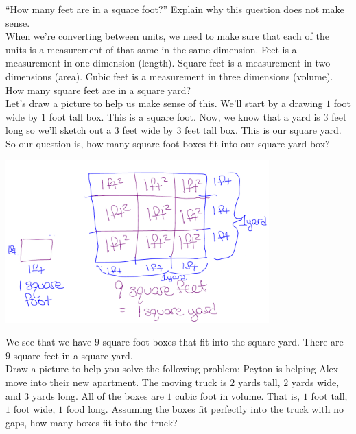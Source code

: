 \documentclass{ximera}
\begin{document}
\begin{exploration}

``How many feet are in a square foot?'' Explain why this question does not make sense.\\

When we're converting between units, we need to make sure that each of the units is a measurement of that same
in the same dimension. Feet is a measurement in one dimension (length). Square feet is a measurement in two dimensions (area). Cubic feet is a measurement in three dimensions (volume). \\

How many square feet are in a square yard?\\

Let's draw a picture to help us make sense of this. We'll start by a drawing $1$ foot wide by $1$ foot tall box. This is a square foot. Now, we know that a yard is $3$ feet long so we'll sketch out a $3$ feet wide by $3$ feet tall box. This is our square yard. So our question is, how many square foot boxes fit into our square yard box? 

\begin{image}
    \includegraphics[width=4in]{sqftyd.png}
\end{image}

We see that we have $9$ square foot boxes that fit into the square yard.  There are $9$ square feet in a square yard.\\

Draw a picture to help you solve the following problem: Peyton is helping Alex move into their new apartment. The moving truck is $2$ yards tall, $2$ yards wide, and $3$ yards long. All of the boxes are $1$ cubic foot in volume.  That is, $1$ foot tall, $1$ foot wide, $1$ food long. Assuming the boxes fit perfectly into the truck with no gaps, how many boxes fit into the truck?

\end{exploration}
\end{document}
